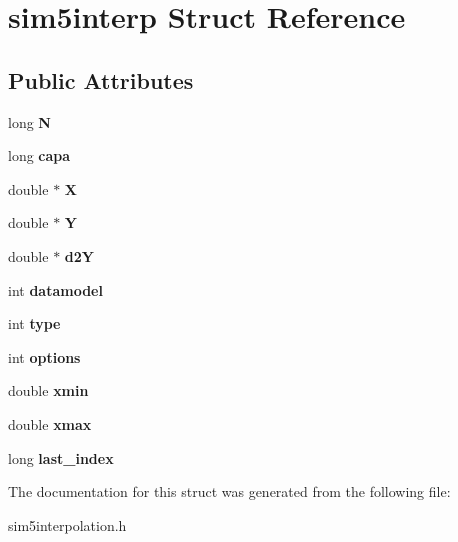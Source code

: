 \hypertarget{structsim5interp}{}\section{sim5interp Struct Reference}
\label{structsim5interp}
\subsection*{Public Attributes}
\begin{DoxyCompactItemize}
\item 
\mbox{\label{structsim5interp_a1b9eaa759c5fa92ea689ae3106115676}} 
long {\bfseries N}
\item 
\mbox{\label{structsim5interp_ad29c8d41334f97c31c125ad04e2dafd7}} 
long {\bfseries capa}
\item 
\mbox{\label{structsim5interp_aaca213506b4a3f5b305c3a1e5a8e8ba4}} 
double $\ast$ {\bfseries X}
\item 
\mbox{\label{structsim5interp_a58bb0b61301103d5659934780d26ecac}} 
double $\ast$ {\bfseries Y}
\item 
\mbox{\label{structsim5interp_a8d611496986f421dbfa8f4282d1e93da}} 
double $\ast$ {\bfseries d2Y}
\item 
\mbox{\label{structsim5interp_a1ece268e88774dedafa55bec33f3cbe2}} 
int {\bfseries datamodel}
\item 
\mbox{\label{structsim5interp_af34bfc8df74544a402c7ce30c1c8ead8}} 
int {\bfseries type}
\item 
\mbox{\label{structsim5interp_a4a259d0ff166e70f7514dbf647649448}} 
int {\bfseries options}
\item 
\mbox{\label{structsim5interp_aaa3f68a22313bf7a767847c226f05f17}} 
double {\bfseries xmin}
\item 
\mbox{\label{structsim5interp_a573a28d317edae3ea7989fb79d3310b5}} 
double {\bfseries xmax}
\item 
\mbox{\label{structsim5interp_aeca63c767536409511ec35a7aca5cddf}} 
long {\bfseries last\+\_\+index}
\end{DoxyCompactItemize}


The documentation for this struct was generated from the following file\+:\begin{DoxyCompactItemize}
\item 
sim5interpolation.\+h\end{DoxyCompactItemize}
